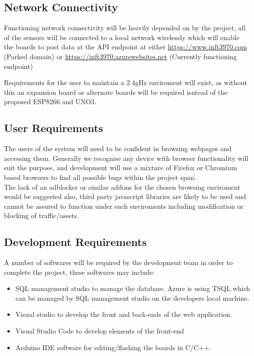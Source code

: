 \documentclass{article}
\begin{document}
        \subsection{Network Connectivity}
            Functioning network connectivity will be heavily depended on by the project,
            all of the sensors will be connected to a local network wirelessly which will enable the boards
            to post data at the API endpoint at either \url{https://www.inft3970.com} (Parked domain) or 
            \url{https://inft3970.azurewebsites.net} (Currently functioning endpoint)
            \par
            Requirements for the user to maintain a 2.4gHz enviroment will exist, as without this an expansion board
            or alternate boards will be required isntead of the proposed ESP8266\cite{ESP8266} and UNO3\cite{UNO3}.
        
        \subsection{User Requirements}
            The users of the system will need to be confident in browsing webpages and accessing them. Generally
            we recognise any device with browser functionality will suit the purpose, and development will use a 
            mixture of Firefox\cite{Firefox} or Chromium\cite{Chromium} based browsers to find all possible bugs 
            within the project span.
            \\
            The lack of an adblocker or similar addons for the chosen browsing enviroment would be suggested also,
            third party javascript libraries are likely to be used and cannot be assured to function under such 
            enviroments including modification or blocking of traffic/assets.
        
        \subsection{Development Requirements}
            A number of softwares will be required by the development team in order to complete the project,
            these softwares may include:
            \begin{itemize}
                \item SQL management studio to manage the database. Azure is using TSQL which can be managed by SQL management studio 
                on the developers local machine.
                \item Visual studio to develop the front and back-ends of the web application. 
                \item Visual Studio Code to develop elements of the front-end
                \item Arduino IDE software for editing/flashing the boards in C/C++.
            \end{itemize}
\end{document}
